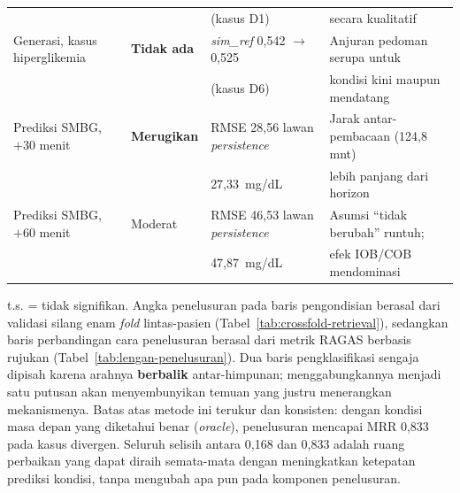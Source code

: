 \begin{table}[htbp]
\begin{tabular}{@{}llll@{}}
& & (kasus D1) & secara kualitatif \\
\addlinespace
Generasi, kasus hiperglikemia & \textbf{Tidak ada} & \emph{sim\_ref} 0,542 $\rightarrow$ 0,525 & Anjuran pedoman serupa untuk \\
& & (kasus D6) & kondisi kini maupun mendatang \\
\midrule
Prediksi SMBG, $+30$ menit & \textbf{Merugikan} & RMSE 28,56 lawan \emph{persistence} & Jarak antar-pembacaan (124,8 mnt) \\
& & 27,33~mg/dL & lebih panjang dari horizon \\
\addlinespace
Prediksi SMBG, $+60$ menit & Moderat & RMSE 46,53 lawan \emph{persistence} & Asumsi ``tidak berubah'' runtuh; \\
& & 47,87~mg/dL & efek IOB/COB mendominasi \\
\bottomrule
\end{tabular}

\vspace{0.4em}
\footnotesize t.s. = tidak signifikan. Angka penelusuran pada baris pengondisian berasal dari validasi silang enam \emph{fold} lintas-pasien (Tabel~\ref{tab:crossfold-retrieval}), sedangkan baris perbandingan cara penelusuran berasal dari metrik RAGAS berbasis rujukan (Tabel~\ref{tab:lengan-penelusuran}). Dua baris pengklasifikasi sengaja dipisah karena arahnya \textbf{berbalik} antar-himpunan; menggabungkannya menjadi satu putusan akan menyembunyikan temuan yang justru menerangkan mekanismenya. Batas atas metode ini terukur dan konsisten: dengan kondisi masa depan yang diketahui benar (\emph{oracle}), penelusuran mencapai MRR 0,833 pada kasus divergen. Seluruh selisih antara 0,168 dan 0,833 adalah ruang perbaikan yang dapat diraih semata-mata dengan meningkatkan ketepatan prediksi kondisi, tanpa mengubah apa pun pada komponen penelusuran.
\end{table}
